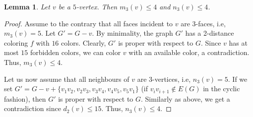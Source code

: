\documentclass[12pt, reqno]{amsart}
\theoremstyle{plain}
\newtheorem{lemma}[equation]{Lemma}
\theoremstyle{definition}
\numberwithin{equation}{section}
\begin{document}
\begin{lemma}\label{lem:faces-on-5-vertex}
Let $v$ be a $5$-vertex. Then $m_3(v)\leq 4$ and $n_3(v)\leq 4$. %
\end{lemma}
\begin{proof}
Assume to the contrary that all faces incident to $v$ are $3$-faces, i.e, $m_3(v)=5$. Let $G'=G-v$.  By minimality, the graph $G'$ has a 2-distance coloring $f$ with $16$ colors.  Clearly, $G'$ is proper with respect to $G$. Since $v$ has at most $15$ forbidden colors, we can color $v$ with an available color, a contradiction. Thus, $m_3(v)\leq 4$.

Let us now assume that all neighbours of $v$ are $3$-vertices, i.e, $n_3(v)=5$. If we set $G'=G-v+\{v_1v_2,v_2v_3,v_3v_4,v_4v_5,v_5v_1\}$ (if $v_iv_{i+1}\notin E(G)$ in the cyclic fashion), then  $G'$ is proper with respect to $G$.
Similarly as above, we get a contradiction since $d_2(v)\leq 15$. 
Thus, $n_3(v)\leq 4$. 
%
%
\end{proof}




\end{document}
